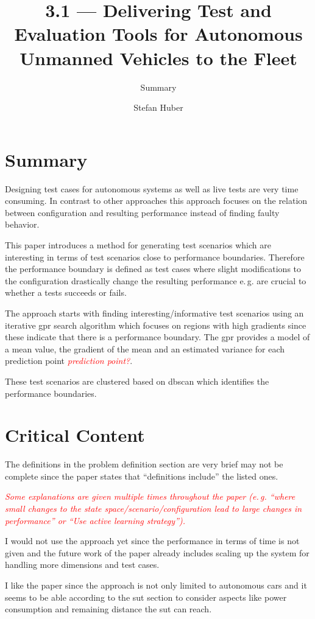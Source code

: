 \documentclass[oneside, notitlepage, twocolumn]{scrartcl}
\title{\LARGE 3.1 --- Delivering Test and Evaluation Tools for Autonomous Unmanned Vehicles to the Fleet}
\subtitle{Summary}
\author{Stefan Huber}
\newcommand{\draft}[1]{\textcolor{red}{\textit{#1}}}
\newcommand{\eg}{e.\,g.\xspace}
\begin{document}
\maketitle

\section{Summary}
Designing test cases for autonomous systems as well as live tests are very time consuming.
In contrast to other approaches this approach focuses on the relation between configuration and resulting performance instead of finding faulty behavior.\par
This paper introduces a method for generating test scenarios which are interesting in terms of test scenarios close to performance boundaries.
Therefore the performance boundary is defined as test cases where slight modifications to the configuration drastically change the resulting performance \eg{} are crucial to whether a tests succeeds or fails.\par
The approach starts with finding interesting/informative test scenarios using an iterative \gls{gpr} search algorithm which focuses on regions with high gradients since these indicate that there is a performance boundary.
The \gls{gpr} provides a model of a mean value, the gradient of the mean and an estimated variance for each prediction point \draft{prediction point?}.\par
These test scenarios are clustered based on \gls{dbscan} which identifies the performance boundaries.

\section{Critical Content}
The definitions in the problem definition section are very brief may not be complete since the paper states that ``definitions include'' the listed ones.\par
\draft{Some explanations are given multiple times throughout the paper (\eg{} ``where small changes to the state space/scenario/configuration lead to large changes in performance'' or ``Use active learning strategy'').}\par
I would not use the approach yet since the performance in terms of time is not given and the future work of the paper already includes scaling up the system for handling more dimensions and test cases.\par
I like the paper since the approach is not only limited to autonomous cars and it seems to be able according to the \gls{sut} section to consider aspects like power consumption and remaining distance the \gls{sut} can reach.
\end{document}
